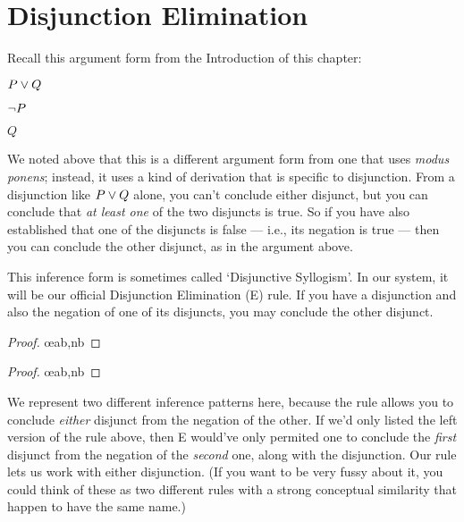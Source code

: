 \section{Disjunction Elimination}

Recall this argument form from the Introduction of this chapter:

\begin{earg}
\item[] $P \vee Q$
\item[] $\neg P$
\item[\therefore] $Q$
\end{earg}

We noted above that this is a different argument form from one that uses \emph{modus ponens}; instead, it uses a kind of derivation that is specific to disjunction. From a disjunction like $P \vee Q$ alone, you can't conclude either disjunct, but you can conclude that \emph{at least one} of the two disjuncts is true. So if you have also established that one of the disjuncts is false --- i.e., its negation is true --- then you can conclude the other disjunct, as in the argument above.

This inference form is sometimes called `Disjunctive Syllogism'. In our system, it will be our official Disjunction Elimination ({\eor}E) rule. If you have a disjunction and also the negation of one of its disjuncts, you may conclude the other disjunct.

\begin{multicols}{2}
\begin{proof}
	\metaA{} \oe{ab,nb}
\end{proof}

\begin{proof}
	\metaB{} \oe{ab,nb}
\end{proof}

\end{multicols}

We represent two different inference patterns here, because the rule allows you to conclude \emph{either} disjunct from the negation of the other. If we'd only listed the left version of the rule above, then {\eor}E would've only permited one to conclude the \emph{first} disjunct from the negation of the \emph{second} one, along with the disjunction. Our rule lets us work with either disjunction. (If you want to be very fussy about it, you could think of these as two different rules with a strong conceptual similarity that happen to have the same name.)

